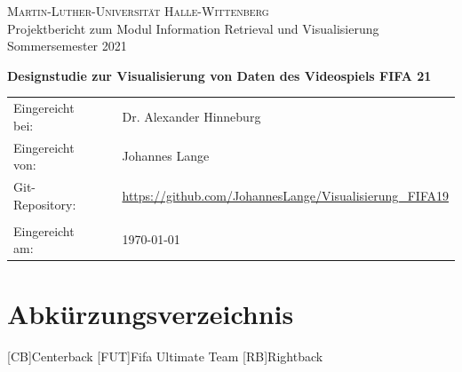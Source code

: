 \documentclass[usegeometry=true]{scrartcl}
\begin{document}

\begin{titlepage}
	\begin{center}
		\large{\textsc{Martin-Luther-Universität Halle-Wittenberg}}\\
				

		Projektbericht zum Modul Information Retrieval und Visualisierung Sommersemester 2021
	\end{center}

	\begin{center}
		\Large
		\textbf{Designstudie zur Visualisierung von Daten des Videospiels FIFA 21}
	\end{center}

	\vskip 1cm

	\vskip 0.75cm

	\begin{center}
		\begin{tabular}{lll}
			Eingereicht bei:& & Dr. Alexander Hinneburg\\
			Eingereicht von:  & & Johannes Lange \\
			Git-Repository: & & \url{https://github.com/JohannesLange/Visualisierung_FIFA19}\\
			& & \\
			Eingereicht am: & & \today
		\end{tabular}
	\end{center}

\end{titlepage}




\newpage
\tableofcontents
\newpage

\clearpage
{}
\listoffigures

\section*{Abkürzungsverzeichnis}\label{AV}
	\begin{acronym}
	[CB]{Centerback}
	[FUT]{Fifa Ultimate Team}
	[RB]{Rightback}
	\end{acronym}
\newpage
\end{document}
